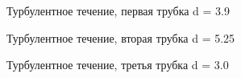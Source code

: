 \documentclass[a4paper,12pt]{article}
\begin{document}
    \begin{figure}[h!]
    \caption[]{ Турбулентное течение, первая трубка d = 3.9 }
    \end{figure}

    \begin{figure}[h!]
    \caption[]{ Турбулентное течение, вторая трубка d = 5.25 }
    \end{figure}

    \begin{figure}[h!]
    \caption[]{ Турбулентное течение, третья трубка d = 3.0 }
    \end{figure}
    
\end{document}
